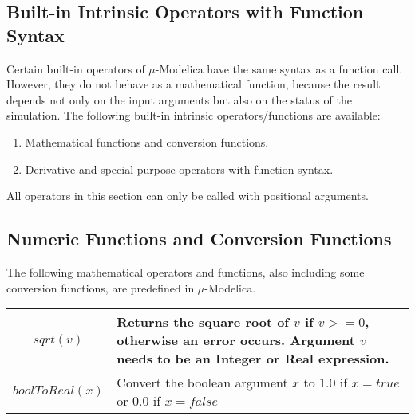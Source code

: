 \documentclass[11pt,a4paper,notitlepage]{report}
\begin{document}
\subsection{Built-in Intrinsic Operators with Function Syntax}
Certain built-in operators of $\mu$-Modelica have the same syntax as a function call. However, they do not behave as a mathematical function, because the result depends not only on the input arguments but also on the status of the simulation. The following built-in intrinsic operators/functions are available:
\begin{enumerate}
\item Mathematical functions and conversion functions.
\item Derivative and special purpose operators with function syntax.
\end{enumerate}

All operators in this section can only be called with positional arguments.

\subsection{Numeric Functions and Conversion Functions}
The following mathematical operators and functions, also including some conversion functions, are predefined in $\mu$-Modelica. 
\begin{center}
\begin{tabular}{|c|p{3in}|}
	\hline
	$sqrt(v)$ & Returns the square root of $v$ if $v>=0$, otherwise an error occurs.
Argument $v$ needs to be an Integer or Real expression.  \\	
	\hline
	$boolToReal(x)$ & Convert the boolean argument $x$ to $1.0$ if $x = true$ or $0.0$ if $x = false$ \\
	\hline
\end{tabular}
\end{center}
\end{document}
